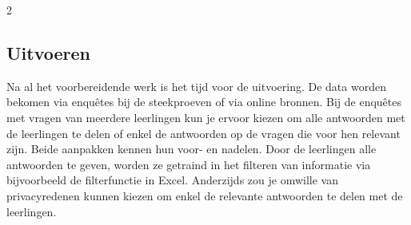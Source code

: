 \begin{multicols}{2}

        
    

          
\subsection*{Uitvoeren}
    Na al het voorbereidende werk is het tijd voor de uitvoering. De data worden bekomen via enqu\^etes bij de steekproeven of via online bronnen. Bij de enqu\^etes met vragen van meerdere leerlingen kun je ervoor kiezen om alle antwoorden met de leerlingen te delen of enkel de antwoorden op de vragen die voor hen relevant zijn. Beide aanpakken kennen hun voor- en nadelen. Door de leerlingen alle antwoorden te geven, worden ze getraind in het filteren van informatie via bijvoorbeeld de filterfunctie in Excel. Anderzijds zou je omwille van privacyredenen kunnen kiezen om enkel de relevante antwoorden te delen met de leerlingen. 


\end{multicols}
